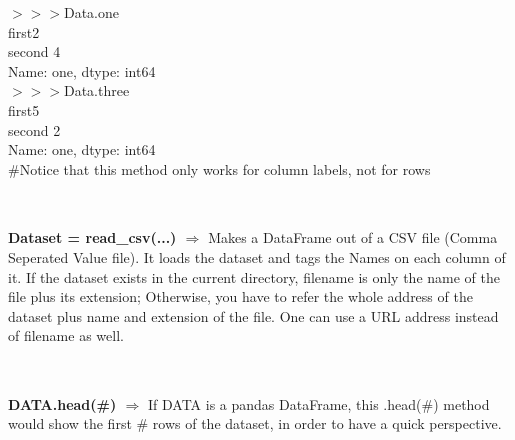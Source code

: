 \documentclass[a4paper,18pt]{article}
\begin{document}
$>>>$Data.one\\

first\hspace*{14pt}2\\
\hspace*{14pt}second    4\\
\hspace*{14pt}Name: one, dtype: int64\\

$>>>$Data.three\\

first\hspace*{14pt}5\\
\hspace*{14pt}second    2\\
\hspace*{14pt}Name: one, dtype: int64\\

\#Notice that this method only works for column labels, not for rows\\\\


\subsection{\colorbox {matgreen}{\color{white}{\large read\_csv(filename,names=Names)}}}
\textbf{Dataset = read\_csv(...) $\Rightarrow$} Makes a DataFrame out of a CSV file (Comma Seperated Value file). It loads the dataset and tags the Names on each column of it. If the dataset exists in the current directory, filename is only the name of the file plus its extension; Otherwise, you have to refer the whole address of the dataset plus name and extension of the file. One can use a URL address instead of filename as well.\\\\


\subsection{\colorbox {matgreen}{\color{white}{\large DATA.head(\#)}}}
\textbf{DATA.head(\#) $\Rightarrow$} If DATA is a pandas DataFrame, this .head(\#) method would show the first \# rows of the dataset, in order to have a quick perspective.\\\\
\end{document}
